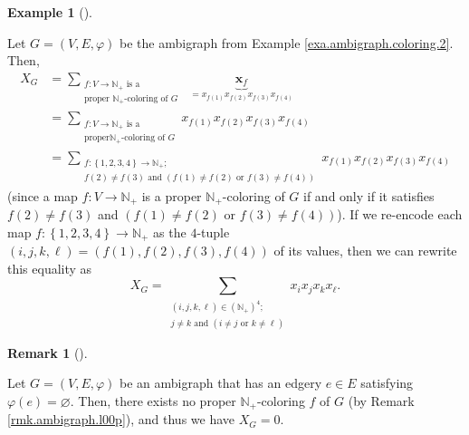 \documentclass[numbers=enddot,12pt,final,onecolumn,notitlepage]{scrartcl}%
\theoremstyle{definition}
\newtheorem{remk}[theo]{Remark}
\newenvironment{remark}[1][]
{\begin{remk}[#1]\begin{leftbar}}
{\end{leftbar}\end{remk}}
\newtheorem{exmp}[theo]{Example}
\newenvironment{example}[1][]
{\begin{exmp}[#1]\begin{leftbar}}
{\end{leftbar}\end{exmp}}
\let\sumnonlimits\sum
\renewcommand{\sum}{\sumnonlimits\limits}
\begin{document}
\begin{example}
Let $G=\left(  V,E,\varphi\right)  $ be the ambigraph from Example
\ref{exa.ambigraph.coloring.2}. Then,%
\begin{align*}
X_{G}  &  =\sum_{\substack{f:V\rightarrow\mathbb{N}_{+}\text{ is
a}\\\text{proper }\mathbb{N}_{+}\text{-coloring of }G}%
}\ \ \underbrace{\mathbf{x}_{f}}_{=x_{f\left(  1\right)  }x_{f\left(
2\right)  }x_{f\left(  3\right)  }x_{f\left(  4\right)  }}\\
&  =\sum_{\substack{f:V\rightarrow\mathbb{N}_{+}\text{ is a}\\\text{proper
}\mathbb{N}_{+}\text{-coloring of }G}}x_{f\left(  1\right)  }x_{f\left(
2\right)  }x_{f\left(  3\right)  }x_{f\left(  4\right)  }\\
&  =\sum_{\substack{f:\left\{  1,2,3,4\right\}  \rightarrow\mathbb{N}%
_{+};\\f\left(  2\right)  \neq f\left(  3\right)  \text{ and }\left(  f\left(
1\right)  \neq f\left(  2\right)  \text{ or }f\left(  3\right)  \neq f\left(
4\right)  \right)  }}x_{f\left(  1\right)  }x_{f\left(  2\right)  }x_{f\left(
3\right)  }x_{f\left(  4\right)  }%
\end{align*}
(since a map $f:V\rightarrow\mathbb{N}_{+}$ is a proper $\mathbb{N}_{+}%
$-coloring of $G$ if and only if it satisfies $f\left(  2\right)  \neq
f\left(  3\right)  $ and $\left(  f\left(  1\right)  \neq f\left(  2\right)
\text{ or }f\left(  3\right)  \neq f\left(  4\right)  \right)  $). If we
re-encode each map $f:\left\{  1,2,3,4\right\}  \rightarrow\mathbb{N}_{+}$ as
the $4$-tuple $\left(  i,j,k,\ell\right)  =\left(  f\left(  1\right)
,f\left(  2\right)  ,f\left(  3\right)  ,f\left(  4\right)  \right)  $ of its
values, then we can rewrite this equality as%
\[
X_{G}=\sum_{\substack{\left(  i,j,k,\ell\right)  \in\left(  \mathbb{N}%
_{+}\right)  ^{4};\\j\neq k\text{ and }\left(  i\neq j\text{ or }k\neq
\ell\right)  }}x_{i}x_{j}x_{k}x_{\ell}.
\]

\end{example}

\begin{remark}
Let $G=\left(  V,E,\varphi\right)  $ be an ambigraph that has an edgery $e\in
E$ satisfying $\varphi\left(  e\right)  =\varnothing$. Then, there exists no
proper $\mathbb{N}_{+}$-coloring $f$ of $G$ (by Remark
\ref{rmk.ambigraph.l00p}), and thus we have $X_{G}=0$.
\end{remark}
\end{document}
